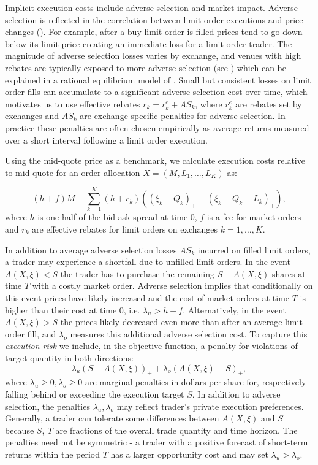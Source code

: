 \documentclass[opre,nonblindrev]{informs3}
\begin{document}
Implicit execution costs include adverse selection and market impact. Adverse selection is reflected in the correlation between limit order executions and price changes (\cite{glosten85}). For example, after a buy limit order is filled prices tend to go down below its limit price creating an immediate loss for a limit order trader. The magnitude of adverse selection losses varies by exchange, and venues with high rebates are typically exposed to more adverse selection (see \cite{Battalio2013}) which can be explained in a rational equilibrium model of \cite{Moallemi2011}. Small but consistent losses on limit order fills can accumulate to a significant adverse selection cost over time, which motivates us to use effective rebates $r_k = r^{e}_k + AS_k$, where $r^{e}_k$ are rebates set by exchanges and $AS_k$ are exchange-specific penalties for adverse selection. In practice these penalties are often chosen empirically as average returns measured over a short interval following a limit order execution.

Using the mid-quote price as a benchmark, we calculate execution costs relative to mid-quote for an order allocation $X=(M,L_1,\dots,L_K)$ as:

\begin{equation}\label{optim.cost}
(h+f)M-\sum_{k=1}^K(h+r_k)((\xi_k-Q_k)_+-(\xi_k-Q_k-L_k)_+),
\end{equation}
\noindent where $h$ is one-half of the bid-ask spread at time 0, $f$ is a fee for market orders and $r_k$ are effective rebates for limit orders on exchanges $k=1,\dots,K$.

In addition to average adverse selection losses $AS_k$ incurred on filled limit orders, a trader may experience a shortfall due to unfilled limit orders. In the event $A(X,\xi)<S$ the trader has to purchase the remaining $S-A(X,\xi)$ shares at time $T$ with a costly market order. Adverse selection implies that conditionally on this event prices have likely increased and the cost of market orders at time $T$ is higher than their cost at time 0, i.e. $\lambda_u>h+f$. Alternatively, in the event $A(X,\xi)>S$ the prices likely decreased even more than after an average limit order fill, and $\lambda_o$ measures this additional adverse selection cost. To capture this {\it execution risk} we include, in the objective function,  a penalty  for violations of  target quantity in both directions:
\begin{equation}\label{optim.tarpen}
\lambda_u\left(S - A(X,\xi)\right)_+
+\lambda_o\left(A(X,\xi)-S\right)_+ ,
\end{equation}
\noindent where $\lambda_u\geq 0,\lambda_o\geq 0$ are marginal penalties in dollars per share for, respectively falling behind or exceeding the execution target $S$. In addition to adverse selection, the penalties $\lambda_u,\lambda_o$ may reflect trader's private execution preferences. Generally, a trader can tolerate some differences between $A(X,\xi)$ and $S$ because $S,~T$ are fractions of the overall trade quantity and time horizon. The penalties need not be symmetric - a trader with a positive forecast of short-term returns within the period $T$ has a larger opportunity cost and may set $\lambda_u>\lambda_o$.
\end{document}
